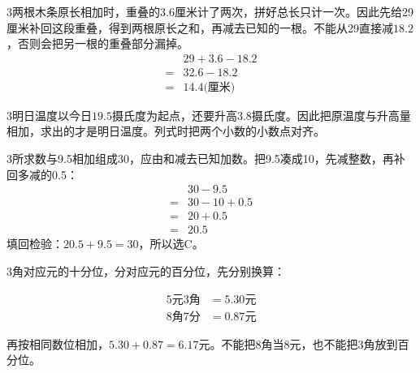 \documentclass[multi=snippet,border={5bp 20bp 5bp 5bp}]{standalone}
\newenvironment{snippet}[3]{\begin{minipage}{#1bp}\color{answerred}\fontsize{#2}{#3}\selectfont\raggedright}{\end{minipage}}
\begin{document}
\begin{snippet}{505}{11.5}{14}\begin{multicols}{3}\raggedcolumns 两根木条原长相加时，重叠的\(3.6\)\allowbreak 厘米计了两次，拼好总长只计一次。因此先给29厘米补回这段重叠，得到两根原长之和，再减去已知的一根。不能从29直接减\(18.2\)\allowbreak ，否则会把另一根的重叠部分漏掉。\[\begin{aligned}&29+3.6-18.2\\={}&32.6-18.2\\={}&14.4\text{(厘米)}\end{aligned}\]\end{multicols}\end{snippet}
\begin{snippet}{505}{11.5}{14}\begin{multicols}{3}\raggedcolumns 明日温度以今日\(19.5\)\allowbreak 摄氏度为起点，还要升高\(3.8\)\allowbreak 摄氏度。因此把原温度与升高量相加，求出的才是明日温度。列式时把两个小数的小数点对齐。\end{multicols}\end{snippet}
\begin{snippet}{505}{11.5}{14}\begin{multicols}{3}\raggedcolumns 所求数与9.5相加组成30，应由和减去已知加数。把9.5凑成10，先减整数，再补回多减的0.5：\[\begin{aligned}&30-9.5\\={}&30-10+0.5\\={}&20+0.5\\={}&20.5\end{aligned}\]填回检验：\(20.5+9.5=30\)\allowbreak ，所以选C。\end{multicols}\end{snippet}
\begin{snippet}{505}{11.5}{14}\begin{multicols}{3}\raggedcolumns 角对应元的十分位，分对应元的百分位，先分别换算：\par\noindent\[\displaystyle \begin{aligned}5\text{元}3\text{角}&=5.30\text{元}\\8\text{角}7\text{分}&=0.87\text{元}\end{aligned}\]\par 再按相同数位相加，\(5.30+0.87=6.17\)\allowbreak 元。不能把8角当8元，也不能把3角放到百分位。\end{multicols}\end{snippet}
\end{document}
